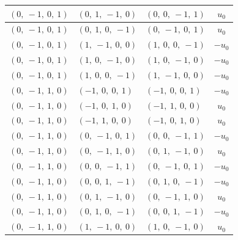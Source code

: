 \documentclass[11pt]{article}
\theoremstyle{definition}
\begin{document}
\begin{longtable}{|l|l|l|c|}
    \hline
    $\left( 0, \  -1, \  0, \  1\right)$ & $\left( 0, \  1, \  -1, \  0\right)$ & $\left( 0, \  0, \  -1, \  1\right)$ & $u_{0}$ \\
    \hline
    $\left( 0, \  -1, \  0, \  1\right)$ & $\left( 0, \  1, \  0, \  -1\right)$ & $\left( 0, \  -1, \  0, \  1\right)$ & $u_{0}$ \\
    \hline
    $\left( 0, \  -1, \  0, \  1\right)$ & $\left( 1, \  -1, \  0, \  0\right)$ & $\left( 1, \  0, \  0, \  -1\right)$ & $- u_{0}$ \\
    \hline
    $\left( 0, \  -1, \  0, \  1\right)$ & $\left( 1, \  0, \  -1, \  0\right)$ & $\left( 1, \  0, \  -1, \  0\right)$ & $- u_{0}$ \\
    \hline
    $\left( 0, \  -1, \  0, \  1\right)$ & $\left( 1, \  0, \  0, \  -1\right)$ & $\left( 1, \  -1, \  0, \  0\right)$ & $- u_{0}$ \\
    \hline
    $\left( 0, \  -1, \  1, \  0\right)$ & $\left( -1, \  0, \  0, \  1\right)$ & $\left( -1, \  0, \  0, \  1\right)$ & $- u_{0}$ \\
    \hline
    $\left( 0, \  -1, \  1, \  0\right)$ & $\left( -1, \  0, \  1, \  0\right)$ & $\left( -1, \  1, \  0, \  0\right)$ & $u_{0}$ \\
    \hline
    $\left( 0, \  -1, \  1, \  0\right)$ & $\left( -1, \  1, \  0, \  0\right)$ & $\left( -1, \  0, \  1, \  0\right)$ & $u_{0}$ \\
    \hline
    $\left( 0, \  -1, \  1, \  0\right)$ & $\left( 0, \  -1, \  0, \  1\right)$ & $\left( 0, \  0, \  -1, \  1\right)$ & $- u_{0}$ \\
    \hline
    $\left( 0, \  -1, \  1, \  0\right)$ & $\left( 0, \  -1, \  1, \  0\right)$ & $\left( 0, \  1, \  -1, \  0\right)$ & $u_{0}$ \\
    \hline
    $\left( 0, \  -1, \  1, \  0\right)$ & $\left( 0, \  0, \  -1, \  1\right)$ & $\left( 0, \  -1, \  0, \  1\right)$ & $- u_{0}$ \\
    \hline
    $\left( 0, \  -1, \  1, \  0\right)$ & $\left( 0, \  0, \  1, \  -1\right)$ & $\left( 0, \  1, \  0, \  -1\right)$ & $- u_{0}$ \\
    \hline
    $\left( 0, \  -1, \  1, \  0\right)$ & $\left( 0, \  1, \  -1, \  0\right)$ & $\left( 0, \  -1, \  1, \  0\right)$ & $u_{0}$ \\
    \hline
    $\left( 0, \  -1, \  1, \  0\right)$ & $\left( 0, \  1, \  0, \  -1\right)$ & $\left( 0, \  0, \  1, \  -1\right)$ & $- u_{0}$ \\
    \hline
    $\left( 0, \  -1, \  1, \  0\right)$ & $\left( 1, \  -1, \  0, \  0\right)$ & $\left( 1, \  0, \  -1, \  0\right)$ & $u_{0}$ \\

\end{longtable}
\end{document}
